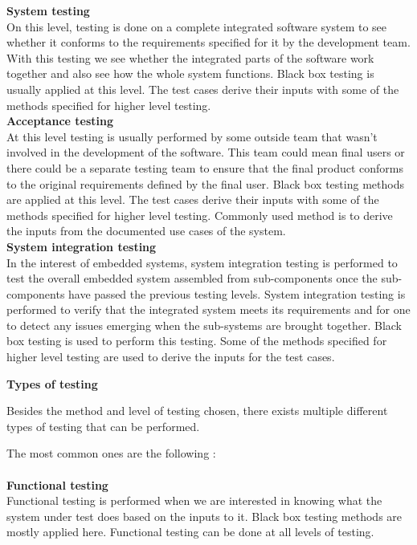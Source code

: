 \documentclass[english,12pt,a4paper,pdftex,elec,utf8]{aaltothesis}
\begin{document}
\textbf{System testing}\\ 
On this level, testing is done on a complete integrated software system to see whether it conforms to the requirements specified for it by the development team. With this testing we see whether the integrated parts of the software work together and also see how the whole system functions. Black box testing is usually applied at this level. The test cases derive their inputs with some of the methods specified for higher level testing.\\
\textbf{Acceptance testing}\\ 
At this level testing is usually performed by some outside team that wasn't involved in the development of the software. This team could mean final users or there could be a separate testing team to ensure that the final product conforms to the original requirements defined by the final user. Black box testing methods are applied at this level. The test cases derive their inputs with some of the methods specified for higher level testing. Commonly used method is to derive the inputs from the documented use cases of the system.\\
\textbf{System integration testing}\\
In the interest of embedded systems, system integration testing is performed to test the overall embedded system assembled from sub-components once the sub-components have passed the previous testing levels. System integration testing is performed to verify that the integrated system meets its requirements and for one to detect any issues emerging when the sub-systems are brought together. Black box testing is used to perform this testing. Some of the methods specified for higher level testing are used to derive the inputs for the test cases. \cite{embeddedsofteng, systinttesting1}\\
\begin{center}
\textbf{Types of testing}
\end{center}
Besides the method and level of testing chosen, there exists multiple different types of testing that can be performed. \cite{sularikurssi, embeddedsofteng, testingcomplex}\par 
The most common ones are the following \cite{sularikurssi}:\\
\\
\textbf{Functional testing}\\
Functional testing is performed when we are interested in knowing what the system under test does based on the inputs to it. Black box testing methods are mostly applied here. Functional testing can be done at all levels of testing.\\ 
\end{document}

